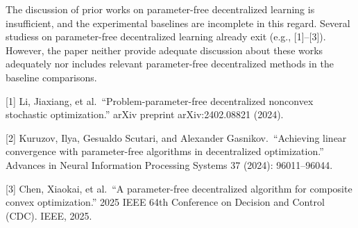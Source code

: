 \documentclass[12pt,english]{reviewresponse}
\begin{document}
\begin{revcomment}
    The discussion of prior works on parameter-free decentralized learning is insufficient, and the experimental baselines are incomplete in this regard. Several studiess on parameter-free decentralized learning already exit (e.g., [1]--[3]). However, the paper neither provide adequate discussion about these works adequately nor includes relevant parameter-free decentralized methods in the baseline comparisons.

        [1] Li, Jiaxiang, et al.\ \enquote{Problem-parameter-free decentralized nonconvex stochastic optimization.} arXiv preprint arXiv:2402.08821 (2024).

        [2] Kuruzov, Ilya, Gesualdo Scutari, and Alexander Gasnikov.\ \enquote{Achieving linear convergence with parameter-free algorithms in decentralized optimization.} Advances in Neural Information Processing Systems 37 (2024): 96011--96044.

        [3] Chen, Xiaokai, et al.\ \enquote{A parameter-free decentralized algorithm for composite convex optimization.} 2025 IEEE 64th Conference on Decision and Control (CDC). IEEE, 2025.
\end{revcomment}
\end{document}
